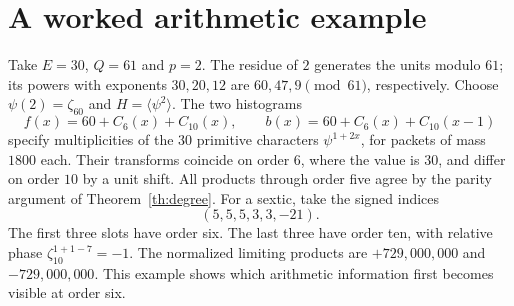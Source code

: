 \documentclass[11pt,letterpaper]{article}
\begin{document}
\section*{A worked arithmetic example}
Take $E=30$, $Q=61$ and $p=2$. The residue of $2$ generates the units modulo $61$; its powers with exponents $30,20,12$ are $60,47,9\pmod{61}$, respectively. Choose $\psi(2)=\zeta_{60}$ and $H=\langle\psi^2\rangle$. The two histograms
\[
      f(x)=60+C_6(x)+C_{10}(x),\qquad
      b(x)=60+C_6(x)+C_{10}(x-1)
\]
specify multiplicities of the $30$ primitive characters $\psi^{1+2x}$, for packets of mass $1800$ each. Their transforms coincide on order $6$, where the value is $30$, and differ on order $10$ by a unit shift. All products through order five agree by the parity argument of Theorem~\ref{th:degree}. For a sextic, take the signed indices
\[
                       (5,5,5,3,3,-21).
\]
The first three slots have order six. The last three have order ten, with relative phase $\zeta_{10}^{1+1-7}=-1$. The normalized limiting products are $+729{,}000{,}000$ and $-729{,}000{,}000$. This example shows which arithmetic information first becomes visible at order six.
\end{document}

